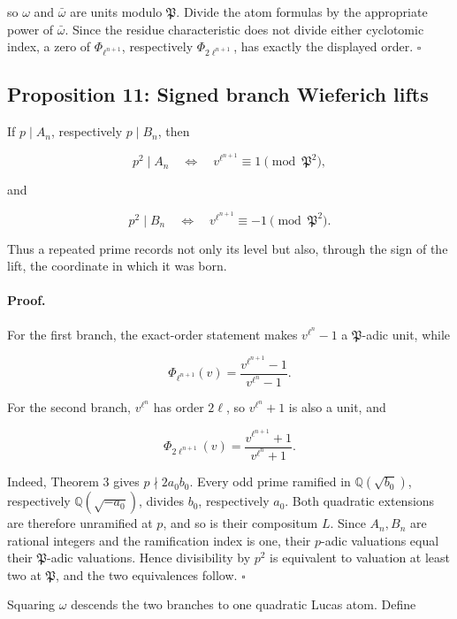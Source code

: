 \documentclass[11pt]{article}
\begin{document}
so \(\omega\) and \(\bar\omega\) are units modulo \(\mathfrak P\). Divide
the atom formulas by the appropriate power of \(\bar\omega\). Since the
residue characteristic does not divide either cyclotomic index, a zero of
\(\Phi_{\ell^{n+1}}\), respectively
\(\Phi_{2\ell^{n+1}}\), has exactly the displayed order. \(\square\)

\subsection{Proposition 11: Signed branch Wieferich lifts}

If \(p\mid A_n\), respectively \(p\mid B_n\), then

\[
p^2\mid A_n
\quad\Longleftrightarrow\quad
v^{\ell^{n+1}}
\equiv1
\pmod{\mathfrak P^2},
\]

and

\[
p^2\mid B_n
\quad\Longleftrightarrow\quad
v^{\ell^{n+1}}
\equiv-1
\pmod{\mathfrak P^2}.
\]

Thus a repeated prime records not only its level but also, through the sign
of the lift, the coordinate in which it was born.

\paragraph{Proof.}

For the first branch, the exact-order statement makes
\(v^{\ell^n}-1\) a \(\mathfrak P\)-adic unit, while

\[
\Phi_{\ell^{n+1}}(v)
=
\frac{v^{\ell^{n+1}}-1}
{v^{\ell^n}-1}.
\]

For the second branch, \(v^{\ell^n}\) has order \(2\ell\), so
\(v^{\ell^n}+1\) is also a unit, and

\[
\Phi_{2\ell^{n+1}}(v)
=
\frac{v^{\ell^{n+1}}+1}
{v^{\ell^n}+1}.
\]

Indeed, Theorem 3 gives \(p\nmid2a_0b_0\). Every odd prime ramified in
\(\mathbb Q(\sqrt{b_0})\), respectively
\(\mathbb Q(\sqrt{-a_0})\), divides \(b_0\), respectively \(a_0\).
Both quadratic extensions are therefore unramified at \(p\), and so is
their compositum \(L\). Since \(A_n,B_n\) are rational integers and the
ramification index is one, their \(p\)-adic valuations equal their
\(\mathfrak P\)-adic valuations. Hence divisibility by \(p^2\) is
equivalent to valuation at least two at \(\mathfrak P\), and the two
equivalences follow. \(\square\)

Squaring \(\omega\) descends the two branches to one quadratic Lucas atom.
Define
\end{document}
